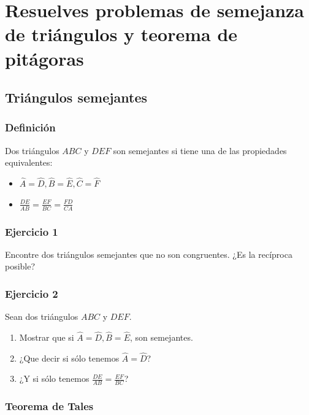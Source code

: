 \chapter{Resuelves problemas de semejanza de triángulos y teorema de pitágoras}

\section{Triángulos semejantes}

\subsection{Definición}

Dos triángulos $ABC$ y $DEF$ son semejantes si tiene una de las propiedades
equivalentes:

\begin{itemize}
\item $\widehat{A} = \widehat{D}, \widehat{B} = \widehat{E},
  \widehat{C} = \widehat{F}$
\item $\frac{DE}{AB} = \frac{EF}{BC} = \frac{FD}{CA}$
\end{itemize}

\subsection{Ejercicio 1}

Encontre dos triángulos semejantes que no son congruentes.
¿Es la recíproca posible?

\subsection{Ejercicio 2}

Sean dos triángulos $ABC$ y $DEF$.

\begin{enumerate}
\item Mostrar que
  si $\widehat{A} = \widehat{D}, \widehat{B} = \widehat{E}$, son semejantes.
\item ¿Que decir si sólo tenemos $\widehat{A} = \widehat{D}$?
\item ¿Y si sólo tenemos $\frac{DE}{AB} = \frac{EF}{BC}$?
\end{enumerate}

\subsection{Teorema de Tales}

